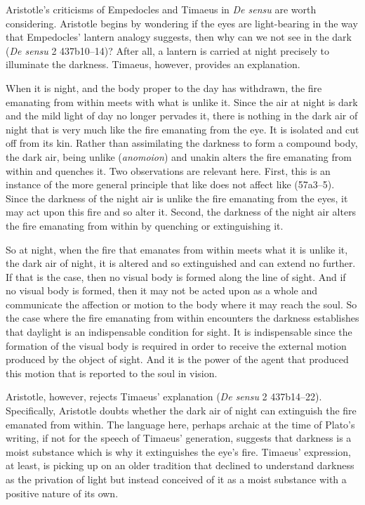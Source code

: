 Aristotle's criticisms of Empedocles and Timaeus in \emph{De sensu} are worth considering. Aristotle begins by wondering if the eyes are light-bearing in the way that Empedocles' lantern analogy suggests, then why can we not see in the dark (\emph{De sensu} 2 437b10--14)? After all, a lantern is carried at night precisely to illuminate the darkness. Timaeus, however, provides an explanation.

When it is night, and the body proper to the day has withdrawn, the fire emanating from within meets with what is unlike it. Since the air at night is dark and the mild light of day no longer pervades it, there is nothing in the dark air of night that is very much like the fire emanating from the eye. It is isolated and cut off from its kin. Rather than assimilating the darkness to form a compound body, the dark air, being unlike (\emph{anomoion}) and unakin alters the fire emanating from within and quenches it. Two observations are relevant here. First, this is an instance of the more general principle that like does not affect like (57a3--5). Since the darkness of the night air is unlike the fire emanating from the eyes, it may act upon this fire and so alter it. Second, the darkness of the night air alters the fire emanating from within by quenching or extinguishing it.

So at night, when the fire that emanates from within meets what it is unlike it, the dark air of night, it is altered and so extinguished and can extend no further. If that is the case, then no visual body is formed along the line of sight. And if no visual body is formed, then it may not be acted upon as a whole and communicate the affection or motion to the body where it may reach the soul. So the case where the fire emanating from within encounters the darkness establishes that daylight is an indispensable condition for sight. It is indispensable since the formation of the visual body is required in order to receive the external motion produced by the object of sight. And it is the power of the agent that produced this motion that is reported to the soul in vision.

Aristotle, however, rejects Timaeus' explanation (\emph{De sensu} 2 437b14--22). Specifically, Aristotle doubts whe\-ther the dark air of night can extinguish the fire emanated from within. The language here, perhaps archaic at the time of Plato's writing, if not for the speech of Timaeus' generation, suggests that darkness is a moist substance which is why it extinguishes the eye's fire. Timaeus' expression, at least, is picking up on an older tradition that declined to understand darkness as the privation of light but instead conceived of it as a moist substance with a positive nature of its own.

